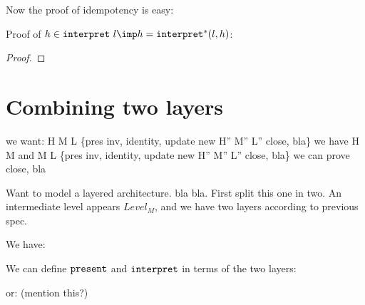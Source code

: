 Now the proof of idempotency is easy:

Proof of $h \in \interpret~l \imp h = \interpret^* (l,h)$:

\begin{proof}
\end{proof}




%																
%																
%																
\section{Combining two layers}

\bl
\* we want: H M L \{pres inv, identity, update \rarr new H'' M'' L'' close, bla\}
\* we have H M and M L  \{pres inv, identity, update \rarr new H'' M'' L'' close, bla\}
\* we can prove close, bla
\el

Want to model a layered architecture. bla bla. First split this one in two. An intermediate level appears $Level_M$, and we have two layers according to previous spec. 

We have: 

We can define ${\tt present}$ and ${\tt interpret}$ in terms of the two layers:


or: (mention this?)


